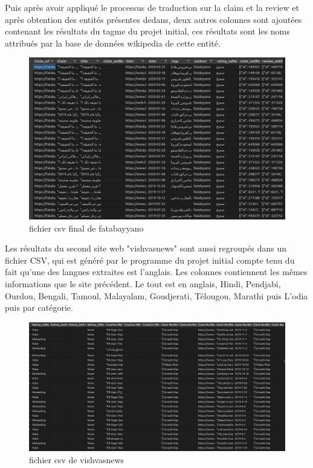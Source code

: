 \documentclass[oneside,13pt,a4paper]{report}
\begin{document}
Puis après avoir appliqué le processus de traduction sur la claim et la review et après obtention des entités présentes dedans, deux autres colonnes sont ajoutées contenant les résultats du tagme du projet initial, ces résultats sont les noms attribués par la base de données wikipedia de cette entité.
\begin{figure}[h]
	\centering
	\begin{minipage}[c]{.5\linewidth}
		\includegraphics[width=1\textwidth]{img/fatab2.png}
		\caption{fichier csv final de fatabayyano}
	\end{minipage}
\end{figure}

Les résultats du second site web "vishvasnews" sont aussi regroupés dans un fichier CSV, qui est généré par le programme du projet initial compte tenu du fait qu'une des langues extraites est l'anglais. Les colonnes contiennent les mêmes informations que le site précédent. Le tout est en anglais, Hindi, Pendjabi, Ourdou, Bengali, Tamoul, Malayalam, Goudjerati, Télougou, Marathi puis L'odia puis par catégorie.

\begin{figure}[h]
	\centering
	\begin{minipage}[c]{.5\linewidth}
		\includegraphics[width=1\textwidth]{img/vishvas.png}
		\caption{fichier csv de vishvasnews}
	\end{minipage}
\end{figure}
\end{document}
